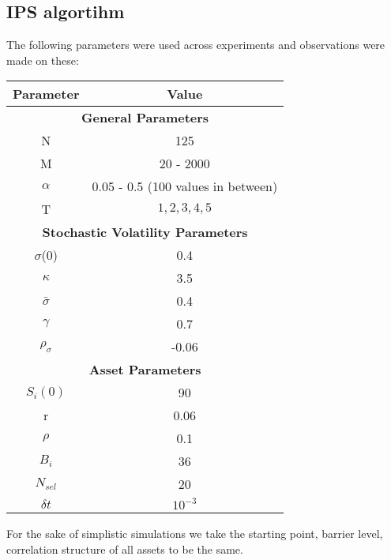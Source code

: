 \subsection{IPS algortihm}
The following parameters were used across experiments and observations were made
on these:
\begin{center}
	\begin{tabular}{|c|c|}
		\hline
		Parameter       & Value                              \\
		\hline
		\multicolumn{2}{|c|}{\textbf{General Parameters}}\\
		\hline
		N               & 125                                \\
		\hline
		M               & 20 - 2000                          \\
		\hline
		$\alpha $       & 0.05 - 0.5 (100 values in between) \\
		\hline
		T               & $1, 2, 3, 4, 5$                    \\
		\hline
		\multicolumn{2}{|c|}{\textbf{Stochastic Volatility Parameters}}\\
		\hline
		$\sigma$(0)     & 0.4                                \\
		\hline
		$\kappa $       & 3.5                                \\
		\hline
		$\bar{\sigma}$  & 0.4                                \\
		\hline
		$\gamma$        & 0.7                                \\
		\hline
		$\rho_{\sigma}$ & -0.06                              \\
		\hline
		\multicolumn{2}{|c|}{\textbf{Asset Parameters}}\\
		\hline
		$S_i(0)$        & 90                                 \\
		\hline
		r               & 0.06                               \\
		\hline
		$\rho$          & 0.1                                \\
		\hline
		$B_i$           & 36                                 \\
		\hline
		$N_{sel}$       & 20                                 \\
		\hline
		$\delta t$      & $10^{-3}$                          \\
		\hline
	\end{tabular}
\end{center}

For the sake of simplistic simulations we take the starting point, barrier
level, correlation structure of all assets to be the same.

